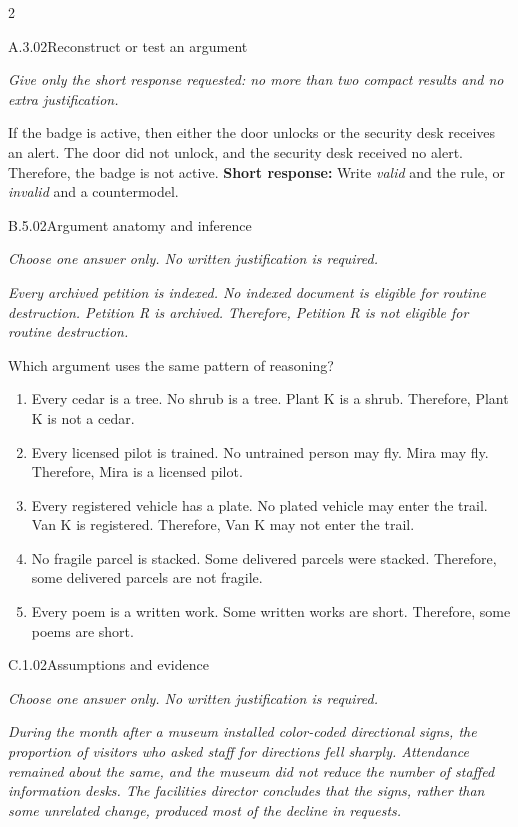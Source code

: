 \documentclass[9pt]{extarticle}
\newcommand{\choice}[1]{\item #1}
\begin{document}
\CoreWorkArea
\FormBreak
{}
\begin{multicols}{2}
\begin{DenseCoreProblem}{A.3.02}{Reconstruct or test an argument}
{\scriptsize\textit{Give only the short response requested: no more than two compact results and no extra justification.}\par}
If the badge is active, then either the door unlocks or the security desk receives an alert. The door did not unlock, and the security desk received no alert. Therefore, the badge is not active.
\textbf{Short response:} Write \emph{valid} and the rule, or \emph{invalid} and a countermodel.
\end{DenseCoreProblem}
\begin{DenseCoreProblem}{B.5.02}{Argument anatomy and inference}
{\scriptsize\textit{Choose one answer only. No written justification is required.}\par}
\emph{Every archived petition is indexed. No indexed document is eligible for routine destruction. Petition R is archived. Therefore, Petition R is not eligible for routine destruction.}

Which argument uses the same pattern of reasoning?
\begin{enumerate}[label=(\alph*)]
  \choice{Every cedar is a tree. No shrub is a tree. Plant K is a shrub. Therefore, Plant K is not a cedar.}
  \choice{Every licensed pilot is trained. No untrained person may fly. Mira may fly. Therefore, Mira is a licensed pilot.}
  \choice{Every registered vehicle has a plate. No plated vehicle may enter the trail. Van K is registered. Therefore, Van K may not enter the trail.}
  \choice{No fragile parcel is stacked. Some delivered parcels were stacked. Therefore, some delivered parcels are not fragile.}
  \choice{Every poem is a written work. Some written works are short. Therefore, some poems are short.}
\end{enumerate}
\end{DenseCoreProblem}
\columnbreak
\begin{DenseCoreProblem}{C.1.02}{Assumptions and evidence}
{\scriptsize\textit{Choose one answer only. No written justification is required.}\par}
\emph{During the month after a museum installed color-coded directional signs, the proportion of visitors who asked staff for directions fell sharply. Attendance remained about the same, and the museum did not reduce the number of staffed information desks. The facilities director concludes that the signs, rather than some unrelated change, produced most of the decline in requests.}


\end{DenseCoreProblem}
\end{multicols}
\end{document}
